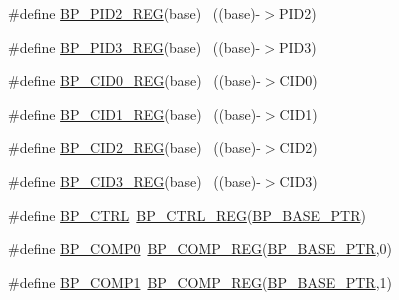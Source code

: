 \begin{DoxyCompactItemize}
\item 
\#define \hyperlink{group___b_p___register___accessor___macros_ga8fbad4569fa23fb6ac3767aa801784d2}{B\+P\+\_\+\+P\+I\+D2\+\_\+\+R\+EG}(base)                                            ~((base)-\/$>$P\+I\+D2)
\item 
\#define \hyperlink{group___b_p___register___accessor___macros_gab274b1e1848f9a6b4dcda2fb35b4db43}{B\+P\+\_\+\+P\+I\+D3\+\_\+\+R\+EG}(base)                                            ~((base)-\/$>$P\+I\+D3)
\item 
\#define \hyperlink{group___b_p___register___accessor___macros_ga732a82c01b34e9b81bb0a4ee7ed32576}{B\+P\+\_\+\+C\+I\+D0\+\_\+\+R\+EG}(base)                                            ~((base)-\/$>$C\+I\+D0)
\item 
\#define \hyperlink{group___b_p___register___accessor___macros_gad04edd6fa092ee8e9af1f2a14f8af779}{B\+P\+\_\+\+C\+I\+D1\+\_\+\+R\+EG}(base)                                            ~((base)-\/$>$C\+I\+D1)
\item 
\#define \hyperlink{group___b_p___register___accessor___macros_ga8a5d96d6c0996bf1023029216b5f1249}{B\+P\+\_\+\+C\+I\+D2\+\_\+\+R\+EG}(base)                                            ~((base)-\/$>$C\+I\+D2)
\item 
\#define \hyperlink{group___b_p___register___accessor___macros_ga70b01e1f6db4f81c8b2111f0f7998ed5}{B\+P\+\_\+\+C\+I\+D3\+\_\+\+R\+EG}(base)                                            ~((base)-\/$>$C\+I\+D3)
\item 
\#define \hyperlink{group___b_p___register___accessor___macros_gae2c0f3938e3a265d4fa841ae915be0e9}{B\+P\+\_\+\+C\+T\+RL}~\hyperlink{group___b_p___register___accessor___macros_ga100429bf971494d180f9acfff3622bbc}{B\+P\+\_\+\+C\+T\+R\+L\+\_\+\+R\+EG}(\hyperlink{group___b_p___peripheral_ga375cd6d2e7ec414f4e33cb54d5494940}{B\+P\+\_\+\+B\+A\+S\+E\+\_\+\+P\+TR})
\item 
\#define \hyperlink{group___b_p___register___accessor___macros_ga38824da6726c25a75da41b2152007d85}{B\+P\+\_\+\+C\+O\+M\+P0}~\hyperlink{group___b_p___register___accessor___macros_ga4efaa53ceb479c2ccba63e6f46db3859}{B\+P\+\_\+\+C\+O\+M\+P\+\_\+\+R\+EG}(\hyperlink{group___b_p___peripheral_ga375cd6d2e7ec414f4e33cb54d5494940}{B\+P\+\_\+\+B\+A\+S\+E\+\_\+\+P\+TR},0)
\item 
\#define \hyperlink{group___b_p___register___accessor___macros_gae4cbb3f2332a48a4338c8b5226350bd7}{B\+P\+\_\+\+C\+O\+M\+P1}~\hyperlink{group___b_p___register___accessor___macros_ga4efaa53ceb479c2ccba63e6f46db3859}{B\+P\+\_\+\+C\+O\+M\+P\+\_\+\+R\+EG}(\hyperlink{group___b_p___peripheral_ga375cd6d2e7ec414f4e33cb54d5494940}{B\+P\+\_\+\+B\+A\+S\+E\+\_\+\+P\+TR},1)

\end{DoxyCompactItemize}
